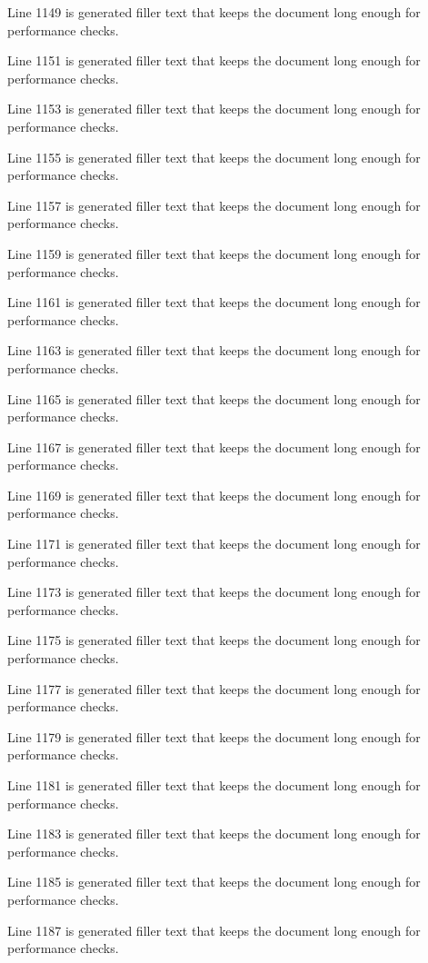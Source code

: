 Line 1149 is generated filler text that keeps the document long enough for performance checks.

Line 1151 is generated filler text that keeps the document long enough for performance checks.

Line 1153 is generated filler text that keeps the document long enough for performance checks.

Line 1155 is generated filler text that keeps the document long enough for performance checks.

Line 1157 is generated filler text that keeps the document long enough for performance checks.

Line 1159 is generated filler text that keeps the document long enough for performance checks.

Line 1161 is generated filler text that keeps the document long enough for performance checks.

Line 1163 is generated filler text that keeps the document long enough for performance checks.

Line 1165 is generated filler text that keeps the document long enough for performance checks.

Line 1167 is generated filler text that keeps the document long enough for performance checks.

Line 1169 is generated filler text that keeps the document long enough for performance checks.

Line 1171 is generated filler text that keeps the document long enough for performance checks.

Line 1173 is generated filler text that keeps the document long enough for performance checks.

Line 1175 is generated filler text that keeps the document long enough for performance checks.

Line 1177 is generated filler text that keeps the document long enough for performance checks.

Line 1179 is generated filler text that keeps the document long enough for performance checks.

Line 1181 is generated filler text that keeps the document long enough for performance checks.

Line 1183 is generated filler text that keeps the document long enough for performance checks.

Line 1185 is generated filler text that keeps the document long enough for performance checks.

Line 1187 is generated filler text that keeps the document long enough for performance checks.


